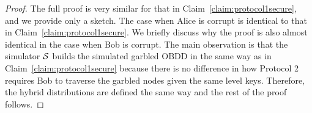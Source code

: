 \begin{proof}
The full proof is very similar for that in
Claim~\ref{claim:protocol1secure}, and we provide only a sketch. The
case when Alice is corrupt is identical to that in
Claim~\ref{claim:protocol1secure}. We briefly discuss why the proof is
also almost identical in the case when Bob is corrupt. The main
observation is that the simulator ${\mathcal{S}}$ builds the simulated garbled
OBDD in the same way as in Claim~\ref{claim:protocol1secure} because
there is no difference in how Protocol 2 requires Bob to traverse the
garbled nodes given the same level keys. Therefore, the hybrid
distributions are defined the same way and the rest of the proof
follows.
\end{proof}
